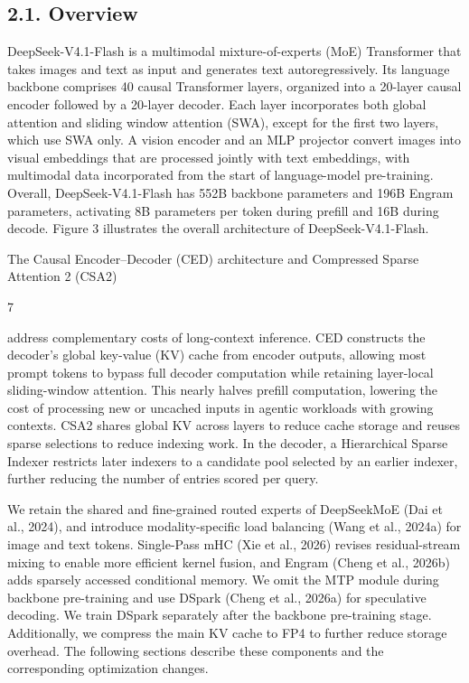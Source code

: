 \documentclass[
  10
]{article}
\begin{document}
\subsection{2.1. Overview}\label{overview}

DeepSeek-V4.1-Flash is a multimodal mixture-of-experts (MoE) Transformer
that takes images and text as input and generates text autoregressively.
Its language backbone comprises 40 causal Transformer layers, organized
into a 20-layer causal encoder followed by a 20-layer decoder. Each
layer incorporates both global attention and sliding window attention
(SWA), except for the first two layers, which use SWA only. A vision
encoder and an MLP projector convert images into visual embeddings that
are processed jointly with text embeddings, with multimodal data
incorporated from the start of language-model pre-training. Overall,
DeepSeek-V4.1-Flash has 552B backbone parameters and 196B Engram
parameters, activating 8B parameters per token during prefill and 16B
during decode. Figure 3 illustrates the overall architecture of
DeepSeek-V4.1-Flash.

The Causal Encoder--Decoder (CED) architecture and Compressed Sparse
Attention 2 (CSA2)

7

address complementary costs of long-context inference. CED constructs
the decoder's global key-value (KV) cache from encoder outputs, allowing
most prompt tokens to bypass full decoder computation while retaining
layer-local sliding-window attention. This nearly halves prefill
computation, lowering the cost of processing new or uncached inputs in
agentic workloads with growing contexts. CSA2 shares global KV across
layers to reduce cache storage and reuses sparse selections to reduce
indexing work. In the decoder, a Hierarchical Sparse Indexer restricts
later indexers to a candidate pool selected by an earlier indexer,
further reducing the number of entries scored per query.

We retain the shared and fine-grained routed experts of DeepSeekMoE (Dai
et al., 2024), and introduce modality-specific load balancing (Wang et
al., 2024a) for image and text tokens. Single-Pass mHC (Xie et al.,
2026) revises residual-stream mixing to enable more efficient kernel
fusion, and Engram (Cheng et al., 2026b) adds sparsely accessed
conditional memory. We omit the MTP module during backbone pre-training
and use DSpark (Cheng et al., 2026a) for speculative decoding. We train
DSpark separately after the backbone pre-training stage. Additionally,
we compress the main KV cache to FP4 to further reduce storage overhead.
The following sections describe these components and the corresponding
optimization changes.
\end{document}
